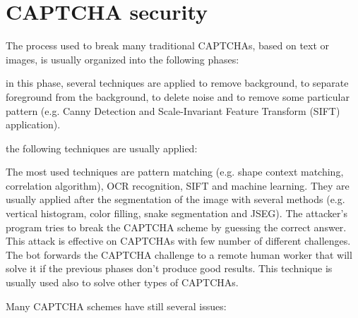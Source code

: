 \section{CAPTCHA security}\label{soa:security_CAPTCHAs}
The process used to break many traditional CAPTCHAs, based on text or images, is usually organized into the following phases\cite{CAPTCHA_attack_process}:
\begin{enumerate}
{in this phase, several techniques are applied to remove background, to separate foreground from the background, to delete noise and to remove some particular pattern (e.g. Canny Detection and Scale-Invariant Feature Transform (SIFT) application).
}
{the following techniques are usually applied:
\begin{itemize}
{The most used techniques are pattern matching (e.g. shape context matching, correlation algorithm), OCR recognition, SIFT and machine learning. They are usually applied after the segmentation of the image with several methods (e.g. vertical histogram, color filling, snake segmentation and JSEG).}
{The attacker's program tries to break the CAPTCHA scheme by guessing the correct answer. This attack is effective on CAPTCHAs with few number of different challenges.}
{The bot forwards the CAPTCHA challenge to a remote human worker that will solve it if the previous phases don't produce good results. This technique is usually used also to solve other types of CAPTCHAs.}
\end{itemize}
}
\end{enumerate}
Many CAPTCHA schemes have still several issues:
